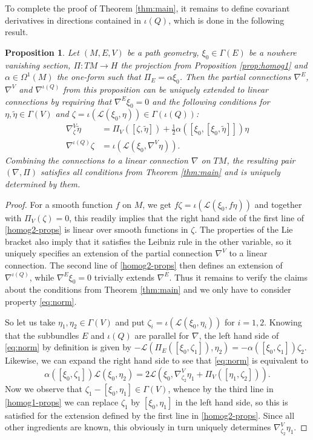 \documentclass[11pt]{amsart}
\newtheorem{proposition}{Proposition}
\numberwithin{proposition}{section}
\numberwithin{equation}{section}
\begin{document}
To complete the proof of Theorem \ref{thm:main}, it remains to define covariant derivatives in directions contained in $\iota(Q)$, which is done in the following result. 
\begin{proposition}\label{prop:homog2}
    Let $(M,E,V)$ be a path geometry, $\xi_0\in\Gamma(E)$ be a nowhere vanishing section, $\Pi:TM\to H$ the projection from Proposition \ref{prop:homog1} and $\alpha\in\Omega^1(M)$ the one-form such that $\Pi_E=\alpha\xi_0$. Then the partial connections $\nabla^E$, $\nabla^V$ and $\nabla^{\iota(Q)}$ from this proposition can be uniquely extended to linear connections by requiring that $\nabla^E\xi_0=0$ and the following conditions for $\eta,\tilde\eta\in\Gamma(V)$ and $\zeta=\iota(\mathcal L(\xi_0,\eta))\in\Gamma(\iota(Q))$:
    \begin{equation}\label{homog2-props}
    \begin{aligned}
     \nabla^V_{\zeta}\tilde\eta&=\Pi_V([\zeta,\tilde\eta])+\tfrac12\alpha([\xi_0,[\xi_0,\tilde\eta]])\eta\\
     \nabla^{\iota(Q)}\zeta &=\iota(\mathcal L(\xi_0,\nabla^V\eta)).    
    \end{aligned}
    \end{equation}
    Combining the connections to a linear connection $\nabla$ on $TM$, the resulting pair $(\nabla,\Pi)$ satisfies all conditions from Theorem \ref{thm:main} and is uniquely determined by them. 
\end{proposition}
\begin{proof}
  For a smooth function $f$ on $M$, we get $f\zeta=\iota(\mathcal L(\xi_0,f\eta))$ and together with $\Pi_V(\zeta)=0$, this readily implies that the right hand side of the first line of \eqref{homog2-props} is linear over smooth functions in $\zeta$. The properties of the Lie bracket also imply that it satisfies the Leibniz rule in the other variable, so it uniquely specifies an extension of the partial connection $\nabla^V$ to a linear connection. The second line of \eqref{homog2-props} then defines an extension of $\nabla^{\iota(Q)}$, while $\nabla^E\xi_0=0$ trivially extends $\nabla^E$. Thus it remains to verify the claims about the conditions from Theorem \ref{thm:main} and we only have to consider property \eqref{eq:norm}. 

So let us take $\eta_1,\eta_2\in\Gamma(V)$ and put $\zeta_i=\iota(\mathcal L(\xi_0,\eta_i))$ for $i=1,2$. Knowing that the subbundles $E$ and $\iota(Q)$ are parallel for $\nabla$, the left hand side of \eqref{eq:norm} by definition is given by $-\mathcal L(\Pi_E([\xi_0,\zeta_1]),\eta_2)=-\alpha([\xi_0,\zeta_1])\zeta_2$. Likewise, we can expand the right hand side to see that \eqref{eq:norm} is equivalent to  
$$
\alpha([\xi_0,\zeta_1])\mathcal L(\xi_0,\eta_2)=2\mathcal L(\xi_0,\nabla^V_{\zeta_2}\eta_1+\Pi_V([\eta_1,\zeta_2])).   
$$
  Now we observe that $\zeta_1-[\xi_0,\eta_1]\in\Gamma(V)$, whence by the third line in \eqref{homog1-props} we can replace $\zeta_1$ by $[\xi_0,\eta_1]$ in the left hand side, so this is satisfied for the extension defined by the first line in \eqref{homog2-props}. Since all other ingredients are known, this obviously in turn uniquely determines $\nabla^V_{\zeta_2}\eta_1$. 
\end{proof}
\end{document}
